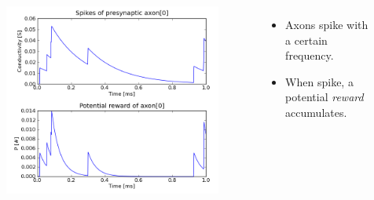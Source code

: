\documentclass{beamer}
\begin{document}
	\begin{frame} 
		\begin{columns} 
				\begin{figure} 
					\centering
					\includegraphics[width=\textwidth]{graphics/demo/fig01} 
				\end{figure} 
				\begin{itemize} 
					\item Axons spike with a certain frequency. 
					\item When spike, a \alert{potential \emph{reward}} accumulates. 
				\end{itemize}
		\end{columns}
	\end{frame}
	
\end{document}
